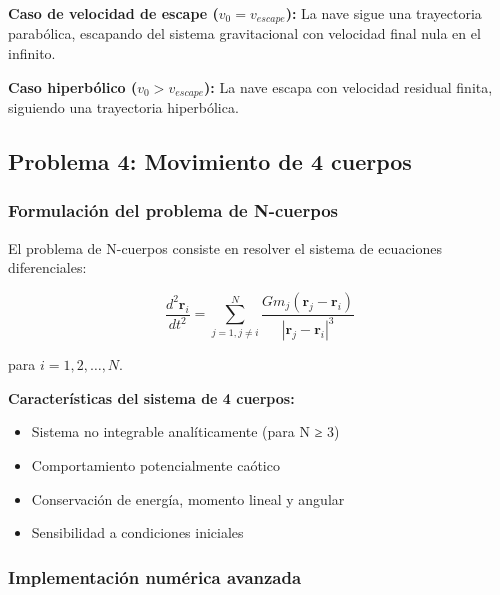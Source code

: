 \documentclass{article}
\begin{document}
	\textbf{Caso de velocidad de escape ($v_0 = v_{escape}$):}
	La nave sigue una trayectoria parabólica, escapando del sistema gravitacional con velocidad final nula en el infinito.
	
	\textbf{Caso hiperbólico ($v_0 > v_{escape}$):}
	La nave escapa con velocidad residual finita, siguiendo una trayectoria hiperbólica.

	\clearpage

	\subsection{Problema 4: Movimiento de 4 cuerpos}
	
	\subsubsection{Formulación del problema de N-cuerpos}
	
	El problema de N-cuerpos consiste en resolver el sistema de ecuaciones diferenciales:
	
	\begin{equation}
		\frac{d^2\mathbf{r}_i}{dt^2} = \sum_{j=1, j \neq i}^{N} \frac{Gm_j(\mathbf{r}_j - \mathbf{r}_i)}{|\mathbf{r}_j - \mathbf{r}_i|^3}
	\end{equation}
	
	para $i = 1, 2, \ldots, N$.
	
	\textbf{Características del sistema de 4 cuerpos:}
	\begin{itemize}
	\item Sistema no integrable analíticamente (para N ≥ 3)
	\item Comportamiento potencialmente caótico
	\item Conservación de energía, momento lineal y angular
	\item Sensibilidad a condiciones iniciales
	\end{itemize}
	
	\subsubsection{Implementación numérica avanzada}
	
\end{document}
